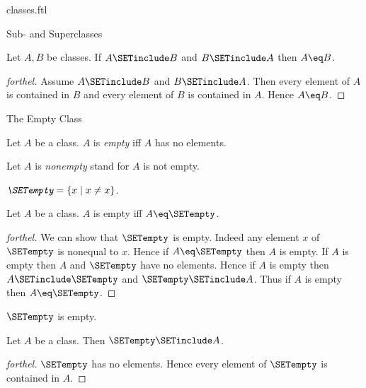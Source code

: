 \documentclass{naproche-library}
\begin{document}
\begin{smodule}[title=Classes]{classes.ftl}
\begin{sfragment}{Sub- and Superclasses}
  \begin{proposition}[forthel,id=FOUNDATIONS_01_7159957847801856]
    Let $A, B$ be classes.
    If $A \SETinclude B$ and $B \SETinclude A$ then $A \eq B$.
  \end{proposition}
  \begin{proof}[forthel]
    Assume $A \SETinclude B$ and $B \SETinclude A$.
    Then every element of $A$ is contained in $B$ and every element of $B$ is contained in $A$.
    Hence $A \eq B$.
  \end{proof}
\end{sfragment}

\begin{sfragment}{The Empty Class}
  \begin{definition}[forthel,id=FOUNDATIONS_01_6252477624090624]
    Let $A$ be a class.
    $A$ is \emph{empty} iff $A$ has no elements.

    Let $A$ is \emph{nonempty} stand for $A$ is not empty.
  \end{definition}

  \begin{definition}[forthel,id=FOUNDATIONS_01_7939928493129728]
    $\emph{\SETempty} = \{ x \mid x \neq x \}$.
  \end{definition}

  \begin{proposition}[forthel,id=FOUNDATIONS_01_2263153161273344]
    Let $A$ be a class.
    $A$ is empty iff $A \eq \SETempty$.
  \end{proposition}
  \begin{proof}[forthel]
    We can show that $\SETempty$ is empty.
    Indeed any element $x$ of $\SETempty$ is nonequal to $x$.
    Hence if $A \eq \SETempty$ then $A$ is empty.
    If $A$ is empty then $A$ and $\SETempty$ have no elements.
    Hence if $A$ is empty then $A \SETinclude \SETempty$ and $\SETempty \SETinclude A$.
    Thus if $A$ is empty then $A \eq \SETempty$.
  \end{proof}

  \begin{corollary}[forthel,id=FOUNDATIONS_01_1495141426659328]
    $\SETempty$ is empty.
  \end{corollary}

  \begin{corollary}[forthel,id=FOUNDATIONS_01_6931785090859008]
    Let $A$ be a class.
    Then $\SETempty \SETinclude A$.
  \end{corollary}
  \begin{proof}[forthel]
    $\SETempty$ has no elements.
    Hence every element of $\SETempty$ is contained in $A$.
  \end{proof}
\end{sfragment}


\end{smodule}
\end{document}
